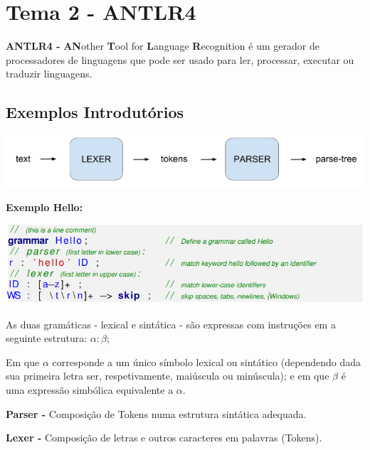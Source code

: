 \documentclass{article}
\begin{document}
\pagebreak

\section{Tema 2 - ANTLR4}

\begin{flushleft}
  \textbf{ANTLR4 -} \textbf{AN}other\textbf{ T}ool for \textbf{L}anguage \textbf{R}ecognition é um gerador de processadores de
  linguagens que pode ser usado para ler, processar, executar ou traduzir linguagens.
\end{flushleft}

\subsection{Exemplos Introdutórios}

\begin{center}
  \includegraphics[scale=0.35]{20}
\end{center}

\begin{flushleft}
  \textbf{Exemplo Hello:}
\end{flushleft}

\begin{center}
  \includegraphics[scale=0.35]{21}
\end{center}

\begin{flushleft}
  \item As duas gramáticas - lexical e sintática - são expressas com instruções em a
  seguinte estrutura: $\alpha : \beta;$
  \item Em que $\alpha$ corresponde a um único símbolo lexical ou sintático (dependendo dada
  sua primeira letra ser, respetivamente, maiúscula ou minúscula); e em que $\beta$
  é uma expressão simbólica equivalente a $\alpha$.

  \item \textbf{Parser -} Composição de Tokens numa estrutura sintática adequada.
  \item \textbf{Lexer -} Composição de letras e outros caracteres em palavras (Tokens).
\end{flushleft}
\end{document}
